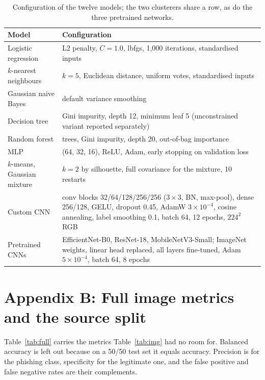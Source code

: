 \documentclass[11pt,journal,a4paper]{IEEEtran}
\newcommand{\tabfont}{\fontsize{11}{13}\selectfont}
\begin{document}
\begin{table}[!ht]
\centering
\caption{Configuration of the twelve models; the two clusterers share a row, as do the three pretrained
networks.}
\label{tab:cfg}
\tabfont
\setlength{\tabcolsep}{5pt}
\begin{tabular}{@{}>{\raggedright\arraybackslash}p{3.4cm}>{\raggedright\arraybackslash}p{11.6cm}@{}}
\toprule
\textbf{Model} & \textbf{Configuration} \\
\midrule
Logistic regression & L2 penalty, $C=1.0$, lbfgs, 1{,}000 iterations, standardised inputs \\
$k$-nearest neighbours & $k=5$, Euclidean distance, uniform votes, standardised inputs \\
Gaussian naive Bayes & default variance smoothing \\
Decision tree & Gini impurity, depth 12, minimum leaf 5 (unconstrained variant reported separately) \\
Random forest & 200 trees, Gini impurity, depth 20, out-of-bag importance \\
MLP & (64, 32, 16), ReLU, Adam, early stopping on validation loss \\
$k$-means, Gaussian mixture & $k=2$ by silhouette, full covariance for the mixture, 10 restarts \\
Custom CNN & 5 conv blocks 32/64/128/256/256 ($3\times3$, BN, max-pool), dense 256/128, GELU, dropout 0.45, AdamW $3\times10^{-4}$, cosine annealing, label smoothing 0.1, batch 64, 12 epochs, $224^2$ RGB \\
Pretrained CNNs & EfficientNet-B0, ResNet-18, MobileNetV3-Small; ImageNet weights, linear head replaced, all layers fine-tuned, Adam $5\times10^{-4}$, batch 64, 8 epochs \\
\bottomrule
\end{tabular}
\end{table}



\clearpage
\section*{Appendix B: Full image metrics and the source split}

Table~\ref{tab:full} carries the metrics Table~\ref{tab:img} had no room for. Balanced accuracy is left out
because on a 50/50 test set it equals accuracy. Precision is for the phishing class, specificity for the
legitimate one, and the false positive and false negative rates are their complements.
\end{document}
